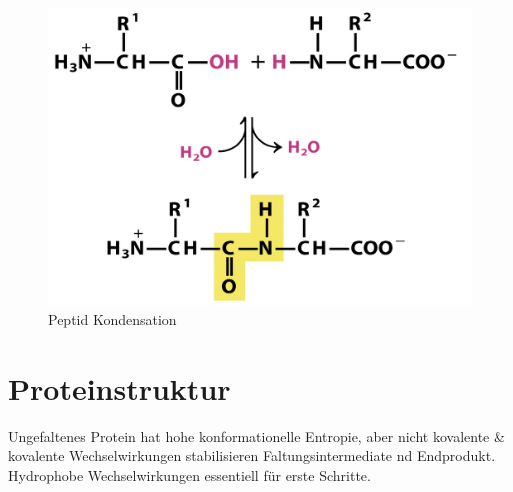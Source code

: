 \documentclass[a4paper,twocolumn,english,fontsize=7,DIV=16]{scrartcl}
\begin{document}
\begin{figure}
	\centering
	\includegraphics[width=\linewidth]{img/peptid_kond.png}
	\caption{Peptid Kondensation}
\end{figure}

\section{Proteinstruktur}

Ungefaltenes Protein hat hohe konformationelle Entropie, aber nicht kovalente
\& kovalente Wechselwirkungen stabilisieren Faltungsintermediate nd Endprodukt.
Hydrophobe Wechselwirkungen essentiell für erste Schritte.
\end{document}
